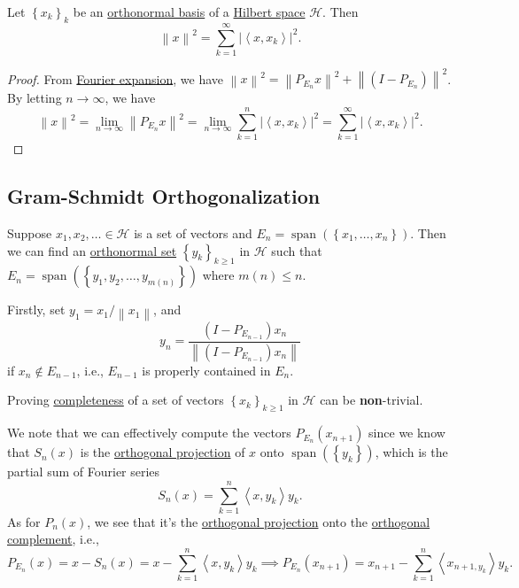 \begin{corollary}\label{col:Parseval}
	Let \(\left\{ x_k \right\} _k\) be an \hyperref[def:orthonormal-basis]{orthonormal basis} of a \hyperref[def:Hilbert-space]{Hilbert space} \(\mathcal{H} \). Then
	\[
		\left\lVert x\right\rVert ^{2} = \sum_{k=1}^{\infty} \left\vert \left\langle x, x_k \right\rangle  \right\vert ^{2} .
	\]
\end{corollary}
\begin{proof}
	From \hyperref[thm:Fourier-expansion]{Fourier expansion}, we have \(\left\lVert x\right\rVert ^{2} = \left\lVert P_{E_n} x \right\rVert^{2} + \left\lVert (I - P_{E_{n} })\right\rVert ^{2}\). By letting \(n \to \infty \), we have
	\[
		\left\lVert x\right\rVert^{2} = \lim\limits_{n \to \infty} \left\lVert P_{E_n}x\right\rVert ^{2} = \lim\limits_{n \to \infty} \sum_{k=1}^{n} \left\vert \left\langle x, x_{k}  \right\rangle  \right\vert ^{2} = \sum_{k=1}^{\infty} \left\vert \left\langle x, x_{k}  \right\rangle  \right\vert  ^{2}.
	\]
\end{proof}

\subsection{Gram-Schmidt Orthogonalization}

Suppose \(x_1, x_2, \ldots \in \mathcal{H}\) is a set of vectors and \(E_n = \mathop{\mathrm{span}}(\left\{ x_1, \ldots , x_n \right\} )\). Then we can find an \hyperref[def:orthonormal-system]{orthonormal set} \(\left\{ y_{k} \right\}_{k\geq 1}\) in \(\mathcal{H}\) such that \(E_n = \mathop{\mathrm{span}}(\left\{ y_1, y_2, \ldots , y_{m(n)}  \right\} )\) where \(m(n) \leq n\).

Firstly, set \(y_1 = x_1 / \left\lVert x_1\right\rVert \), and
\[
	y_n = \frac{(I - P_{E_{n-1}})x_n}{\left\lVert (I - P_{E_{n-1}})x_n \right\rVert}
\]
if \(x_n \notin E_{n-1}\), i.e., \(E_{n-1}\) is properly contained in \(E_n\).

\begin{remark}
	Proving \hyperref[def:complete-system]{completeness} of a set of vectors \(\left\{ x_k \right\}_{k\geq 1} \) in \(\mathcal{H} \) can be \textbf{non}-trivial.
\end{remark}

We note that we can effectively compute the vectors \(P_{E_n} (x_{n+1}) \) since we know that \(S_n(x)\) is the \hyperref[def:orthogonal-projection]{orthogonal projection} of \(x\) onto \(\mathop{\mathrm{span}}(\left\{ y_k \right\} )\), which is the partial sum of Fourier series
\[
	S_n(x) = \sum_{k=1} ^n \left\langle x, y_k \right\rangle y_k.
\]
As for \(P_n(x)\), we see that it's the \hyperref[def:orthogonal-projection]{orthogonal projection} onto the \hyperref[def:orthogonal-complement]{orthogonal complement}, i.e.,
\[
	P_{E_n}(x) = x - S_n(x) = x - \sum_{k=1} ^n \left\langle x, y_{k}  \right\rangle y_{k} \implies P_{E_n}(x_{n+1} ) = x_{n+1} - \sum\limits_{k=1}^{n} \left\langle x_{n+1, y_{k} }  \right\rangle  y_{k}.
\]

